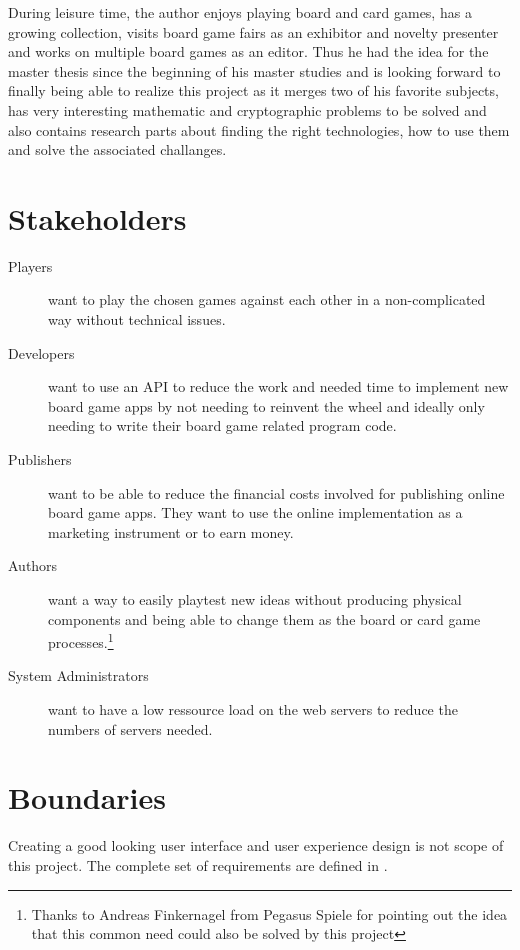 During leisure time, the author enjoys playing board and card games, has a
growing collection, visits board game fairs as an exhibitor and novelty
presenter and works on multiple board games as an editor. Thus he had the idea
for the master thesis since the beginning of his master studies and is looking
forward to finally being able to realize this project as it merges two of his
favorite subjects, has very interesting mathematic and cryptographic problems to
be solved and also contains research parts about finding the right
technologies, how to use them and solve the associated challanges.

\section{Stakeholders}

\begin{description}
  \item[Players] want to play the chosen games against each other in a
  non-complicated way without technical issues.
  \item[Developers] want to use an API to reduce the work and needed time to
  implement new board game apps by not needing to reinvent the wheel and ideally
  only needing to write their board game related program code.
  \item[Publishers] want to be able to reduce the financial costs
  involved for publishing online board game apps. They want to use the online
  implementation as a marketing instrument or to earn money.
  \item[Authors] want a way to easily playtest new ideas without producing
  physical components and being able to change them as the board or card game
  processes.\footnote{Thanks to Andreas Finkernagel from Pegasus Spiele for
  pointing out the idea that this common need could also be solved by this
  project}
  \item[System Administrators] want to have a low ressource load on the web
  servers to reduce the numbers of servers needed.
\end{description}

\section{Boundaries}

Creating a good looking user interface and user experience design is not scope
of this project. The complete set of requirements are defined in
.
